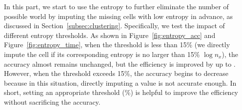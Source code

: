 %
In this part, we start to use the entropy to further eliminate the number of possible world by imputing the missing cells with low entropy in advance, as discussed in Section~\ref{subsec:clustering}. 
%
Specifically, we test the impact of different entropy thresholds. As shown in Figure~\ref{fig:entropy_acc} and Figure~\ref{fig:entropy_time}, when the threshold is less than  15\% (\ie we directly impute the cell if its corresponding entropy is no larger than 15\% $\log n_x$), the accuracy almost remains unchanged, but the efficiency is improved by up to . However, when the threshold exceeds 15\%, the accuracy begins to decrease because in this situation, directly imputing a value is not accurate enough. In short, setting an appropriate threshold (\%) is helpful to improve the efficiency without sacrificing the accuracy. 


%
